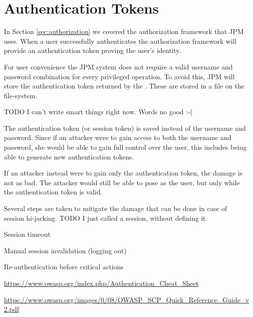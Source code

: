 \section{Authentication Tokens}

In Section \ref{sec:authorization} we covered the authorization framework that
JPM uses. When a user successfully authenticates the authorization framework
will provide an authentication token proving the user's identity.

For user convenience the JPM system does not require a valid username and
password combination for every privileged operation. To avoid this, JPM will
store the authentication token returned by the \registry. These are stored in a
file on the file-system.

TODO I can't write smart things right now. Words no good :-(

The authentication token (or session token) is saved instead of the username
and password.  Since if an attacker were to gain access to both the username
and password, she would be able to gain full control over the user, this
includes being able to generate new authentication tokens.

If an attacker instead were to gain only the authentication token, the damage
is not as bad. The attacker would still be able to pose as the user, but only
while the authentication token is valid.

Several steps are taken to mitigate the damage that can be done in case of
session hi-jacking. TODO I just called a session, without defining it.



Session timeout


Manual session invalidation (logging out)


Re-authentication before critical actions


\url{https://www.owasp.org/index.php/Authentication_Cheat_Sheet}

\url{https://www.owasp.org/images/0/08/OWASP_SCP_Quick_Reference_Guide_v2.pdf}
